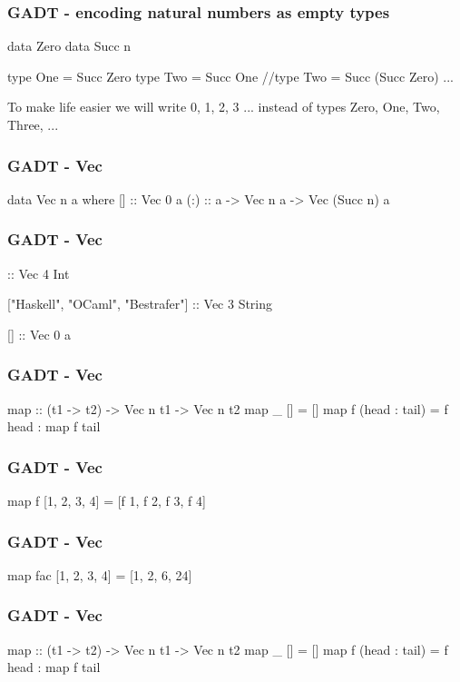 \documentclass{beamer}
\newenvironment{VerbExample}
{\example\semiverbatim}
{\endsemiverbatim\endexample}
\begin{document}
\begin{frame}[fragile]
  \frametitle{GADT - encoding natural numbers as empty types}
  \begin{VerbExample}
data Zero
data Succ n

type One = Succ Zero
type Two = Succ One
//type Two = Succ (Succ Zero)
...

To make life easier we will write
0, 1, 2, 3 ... instead of types
Zero, One, Two, Three, ...
  \end{VerbExample}
\end{frame}


\begin{frame}[fragile]
  \frametitle{GADT - Vec}
  \begin{VerbExample}
data Vec n a where
  [] :: Vec 0 a
  (:) :: a -> Vec n a -> Vec (Succ n) a
  \end{VerbExample}
\end{frame}

\begin{frame}[fragile]
  \frametitle{GADT - Vec}
  \begin{VerbExample}
[42, 5, 44, 59] :: Vec 4 Int

["Haskell", "OCaml", "Bestrafer"] :: Vec 3 String

[] :: Vec 0 a
  \end{VerbExample}
\end{frame}

\begin{frame}[fragile]
  \frametitle{GADT - Vec}
  \begin{VerbExample}
map :: (t1 -> t2) -> Vec n t1 -> Vec n t2
map _ [] = []
map f (head : tail) = f head : map f tail
  \end{VerbExample}
\end{frame}

\begin{frame}[fragile]
  \frametitle{GADT - Vec}
  \begin{VerbExample}
map f [1, 2, 3, 4] = [f 1, f 2, f 3, f 4]
  \end{VerbExample}
\end{frame}

\begin{frame}[fragile]
  \frametitle{GADT - Vec}
  \begin{VerbExample}
map fac [1, 2, 3, 4] = [1, 2, 6, 24]
  \end{VerbExample}
\end{frame}

\begin{frame}[fragile]
  \frametitle{GADT - Vec}
  \begin{VerbExample}
map :: (t1 -> t2) -> Vec n t1 -> Vec n t2
map _ [] = []
map f (head : tail) = f head : map f tail
  \end{VerbExample}
\end{frame}
\end{document}
